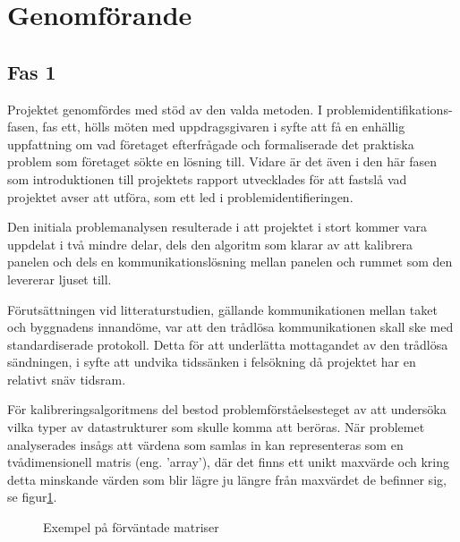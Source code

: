 \section{Genomförande} %
\label{sec:genomf_rande}
    \subsection{Fas 1} %
    \label{sub:steg_1}
        Projektet genomfördes med stöd av den valda metoden. I problemidentifikations-fasen, fas ett, hölls möten med uppdragsgivaren i syfte att få en enhällig uppfattning om vad företaget efterfrågade och formaliserade det praktiska problem som företaget sökte en lösning till. Vidare är det även i den här fasen som introduktionen till projektets rapport utvecklades för att fastslå vad projektet avser att utföra, som ett led i problemidentifieringen. \bigskip

        Den initiala problemanalysen resulterade i att projektet i stort kommer vara uppdelat i två mindre delar, dels den algoritm som klarar av att kalibrera panelen och dels en kommunikationslösning mellan panelen och rummet som den levererar ljuset till. \bigskip

        Förutsättningen vid litteraturstudien, gällande kommunikationen mellan taket och byggnadens innandöme, var att den trådlösa kommunikationen skall ske med standardiserade protokoll. Detta för att underlätta mottagandet av den trådlösa sändningen, i syfte att undvika tidssänken i felsökning då projektet har en relativt snäv tidsram.\bigskip

        För kalibreringsalgoritmens del bestod problemförståelsesteget av att undersöka vilka typer av datastrukturer som skulle komma att beröras. När problemet analyserades insågs att värdena som samlas in kan representeras som en tvådimensionell matris (eng. 'array'), där det finns ett unikt maxvärde och kring detta minskande värden som blir lägre ju längre från maxvärdet de befinner sig, se figur\ref{fig:array}. \bigskip

        \begin{figure}[hbt]
        \centering
            \begin{subfigure}{0.2\textwidth}
            \end{subfigure}
            \begin{subfigure}{0.2\textwidth}
            \end{subfigure}
        \caption{\label{fig:array} Exempel på förväntade matriser}
        \end{figure}


